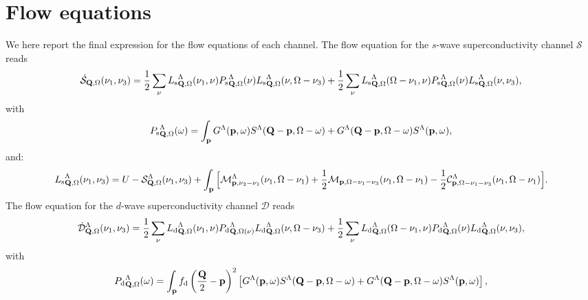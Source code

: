 \appendix 
\section{Flow equations}
\label{sec:FlowEquations}

We here report the final expression for the flow equations of each channel.
The flow equation for the $s$-wave superconductivity channel $\mathcal{S}$ reads
\begin{equation}
\dot{\mathcal{S}}_{\mathbf{Q},\Omega}(\nu_1,\nu_3) = 
  \frac{1}{2} \sum_{\nu}{L_\mathrm{s}}^{\Lambda}_{\mathbf{Q},\Omega} (\nu_1,\nu) {P_{\mathrm{s}}}^{\Lambda}_{\mathbf{Q},\Omega}(\nu) {L_\mathrm{s}}^{\Lambda}_{\mathbf{Q},\Omega} (\nu,\Omega-\nu_3)
+ \frac{1}{2} \sum_{\nu}{L_\mathrm{s}}^{\Lambda}_{\mathbf{Q},\Omega} (\Omega-\nu_1,\nu) {P_{\mathrm{s}}}^{\Lambda}_{\mathbf{Q},\Omega}(\nu) {L_\mathrm{s}}^{\Lambda}_{\mathbf{Q},\Omega}(\nu,\nu_3),
\end{equation} 	   
with
\begin{equation}
{P_{\mathrm{s}}}^{\Lambda}_{\mathbf{Q},\Omega}(\omega) = \int_{\mathbf{p}}  G^{\Lambda}(\mathbf{p},\omega)S^{\Lambda}(\mathbf{Q}-\mathbf{p},\Omega-\omega) + 
G^{\Lambda}(\mathbf{Q}-\mathbf{p},\Omega-\omega) S^{\Lambda}(\mathbf{p},\omega), 
\label{eq:app:P_pp}
\end{equation} 
and: 
\begin{align} 
\label{eq:Lswave}
{L_\mathrm{s}}^{\Lambda}_{\mathbf{Q},\Omega}(\nu_1,\nu_3) = U-\mathcal{S}^{\Lambda}_{\mathbf{Q},\Omega} (\nu_1,\nu_3)
+ \int_{\mathbf{p}}  \Big[ \mathcal{M}^{\Lambda}_{\mathbf{p},\nu_3-\nu_1}(\nu_1,\Omega-\nu_1) + \frac{1}{2} \mathcal{M}_{\mathbf{p},\Omega-\nu_1-\nu_3}(\nu_1,\Omega-\nu_1) 
- \frac{1}{2} \mathcal{C}^{\Lambda}_{\mathbf{p},\Omega-\nu_1-\nu_3}(\nu_1,\Omega-\nu_1) \Big]. 
\end{align}	 
The flow equation for the $d$-wave superconductivity channel  $\mathcal{D}$ reads
\begin{equation}
\dot{\mathcal{D}}^{\Lambda}_{\mathbf{Q},\Omega}(\nu_1,\nu_3) = 
  \frac{1}{2} \sum_{\nu}{L_\mathrm{d}}^{\Lambda}_{\mathbf{Q},\Omega}(\nu_1,\nu) {P_{\mathrm{d}}}^{\Lambda}_{\mathbf{Q},\Omega(\nu)} {L_\mathrm{d}}^{\Lambda}_{\mathbf{Q},\Omega} (\nu,\Omega-\nu_3) 
+ \frac{1}{2} \sum_{\nu}{L_\mathrm{d}}^{\Lambda}_{\mathbf{Q},\Omega}(\Omega-\nu_1,\nu) {P_{\mathrm{d}}}^{\Lambda}_{\mathbf{Q},\Omega}(\nu) {L_\mathrm{d}}^{\Lambda}_{\mathbf{Q},\Omega}(\nu,\nu_3),
\label{eq:dwaveflow}
\end{equation}
with
\begin{equation}
{P_{\mathrm{d}}}^{\Lambda}_{\mathbf{Q},\Omega}(\omega) = \int_{\mathbf{p}}  f_{\mathrm{d}}\left(\frac{\mathbf{Q}}{2}-\mathbf{p}\right)^2 
\left[ G^{\Lambda}(\mathbf{p},\omega)S^{\Lambda}(\mathbf{Q}-\mathbf{p},\Omega-\omega) +G^{\Lambda}(\mathbf{Q}-\mathbf{p},\Omega-\omega)
S^{\Lambda}(\mathbf{p},\omega) \right], 
\label{eq:app:P_pp}
\end{equation} 
